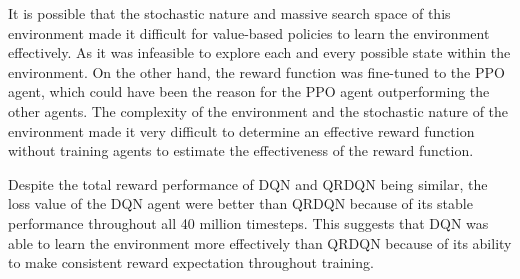 It is possible that the stochastic nature and massive search space of this environment made it difficult for value-based policies to learn the environment effectively. As it was infeasible to explore each and every possible state within the environment. On the other hand, the reward function was fine-tuned to the PPO agent, which could have been the reason for the PPO agent outperforming the other agents. The complexity of the environment and the stochastic nature of the environment made it very difficult to determine an effective reward function without training agents to estimate the effectiveness of the reward function. 

Despite the total reward performance of DQN and QRDQN being similar, the loss value of the DQN agent were better than QRDQN because of its stable performance throughout all 40 million timesteps. This suggests that DQN was able to learn the environment more effectively than QRDQN because of its ability to make consistent reward expectation throughout training.
